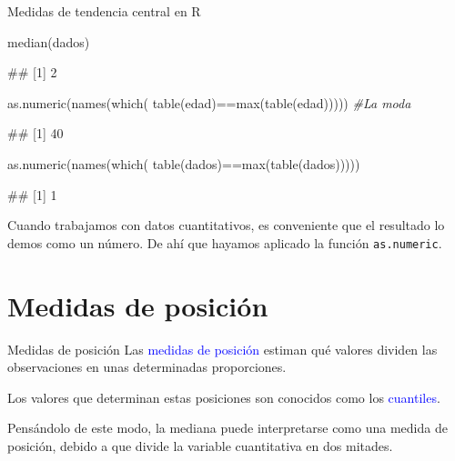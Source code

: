 \documentclass[
  ignorenonframetext,
  aspectratio=169]{beamer}
\newenvironment{Shaded}{\begin{snugshade}}{\end{snugshade}}
\newcommand{\CommentTok}[1]{\textcolor[rgb]{0.56,0.35,0.01}{\textit{#1}}}
\newcommand{\FunctionTok}[1]{\textcolor[rgb]{0.00,0.00,0.00}{#1}}
\newcommand{\NormalTok}[1]{#1}
\newcommand{\SpecialCharTok}[1]{\textcolor[rgb]{0.00,0.00,0.00}{#1}}
\let\oldverbatim\verbatim
\let\endoldverbatim\endverbatim
\renewenvironment{verbatim}{\tiny\oldverbatim}{\endoldverbatim}
\newcommand\blue[1]{\textcolor{blue}{#1}}
\begin{document}
\begin{frame}[fragile]{Medidas de tendencia central en R}
\protect\hypertarget{medidas-de-tendencia-central-en-r-1}{}
\begin{Shaded}
\begin{Highlighting}[]
\FunctionTok{median}\NormalTok{(dados)}
\end{Highlighting}
\end{Shaded}

\begin{verbatim}
## [1] 2
\end{verbatim}

\begin{Shaded}
\begin{Highlighting}[]
\FunctionTok{as.numeric}\NormalTok{(}\FunctionTok{names}\NormalTok{(}\FunctionTok{which}\NormalTok{(}
  \FunctionTok{table}\NormalTok{(edad)}\SpecialCharTok{==}\FunctionTok{max}\NormalTok{(}\FunctionTok{table}\NormalTok{(edad))))) }\CommentTok{\#La moda}
\end{Highlighting}
\end{Shaded}

\begin{verbatim}
## [1] 40
\end{verbatim}

\begin{Shaded}
\begin{Highlighting}[]
\FunctionTok{as.numeric}\NormalTok{(}\FunctionTok{names}\NormalTok{(}\FunctionTok{which}\NormalTok{(}
  \FunctionTok{table}\NormalTok{(dados)}\SpecialCharTok{==}\FunctionTok{max}\NormalTok{(}\FunctionTok{table}\NormalTok{(dados)))))}
\end{Highlighting}
\end{Shaded}

\begin{verbatim}
## [1] 1
\end{verbatim}

Cuando trabajamos con datos cuantitativos, es conveniente que el
resultado lo demos como un número. De ahí que hayamos aplicado la
función \texttt{as.numeric}.
\end{frame}

\hypertarget{medidas-de-posiciuxf3n}{%
\section{Medidas de posición}\label{medidas-de-posiciuxf3n}}

\begin{frame}{Medidas de posición}
\protect\hypertarget{medidas-de-posiciuxf3n-1}{}
Las \blue{medidas de posición} estiman qué valores dividen las
observaciones en unas determinadas proporciones.

Los valores que determinan estas posiciones son conocidos como los
\blue{cuantiles}.

Pensándolo de este modo, la mediana puede interpretarse como una medida
de posición, debido a que divide la variable cuantitativa en dos
mitades.
\end{frame}
\end{document}
